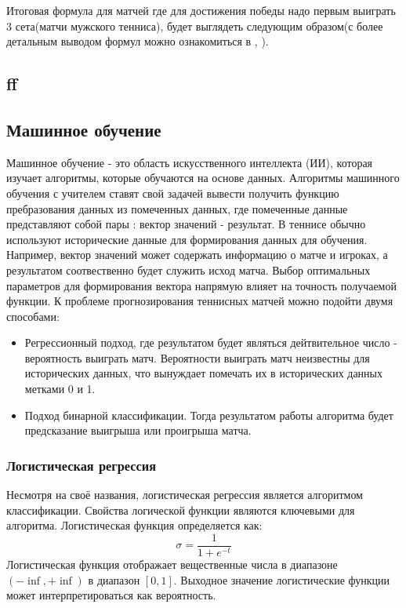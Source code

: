 Итоговая формула для матчей где для достижения победы надо первым выиграть 3 сета(матчи мужского тенниса), будет выглядеть следующим образом(с более детальным выводом формул можно ознакомиться в \cite{Book08}, \cite{Book09}).
\subsection{ff}

\subsection{Машинное обучение}
Машинное обучение - это область искусственного интеллекта (ИИ), которая изучает алгоритмы, которые обучаются на основе данных.
Алгоритмы машинного обучения с учителем ставят свой задачей вывести получить функцию пребразования данных из помеченных данных, где помеченные данные представляют собой пары : вектор значений  - результат.
В теннисе обычно используют исторические данные для формирования данных для обучения. Например, вектор значений может содержать информацию о матче и игроках, а результатом соотвественно будет служить исход матча. Выбор оптимальных параметров для формирования вектора напрямую влияет на точность получаемой функции.
К проблеме прогнозирования теннисных матчей можно подойти двумя способами:
\begin{itemize}
	\item Регрессионный подход, где результатом будет являться дейтвительное число - вероятность выиграть матч. Вероятности выиграть матч неизвестны для исторических данных, что вынуждает помечать их в исторических данных метками 0 и 1.
	\item Подход бинарной классификации. Тогда результатом работы алгоритма будет предсказание выигрыша или проигрыша матча.
\end{itemize}
\break
\subsubsection{Логистическая регрессия}
Несмотря на своё названия, логистическая регрессия является алгоритмом классификации. Свойства логической функции являются ключевыми для алгоритма. Логистическая функция определяется как:
\begin{equation}
\sigma=\frac{1}{1 + e^{-t}}
\end{equation}
Логистическая функция отображает 
вещественные числа в диапазоне $(-\inf, +\inf)$ в диапазон $[0,1]$. Выходное значение логистические функции может интерпретироваться как вероятность.


